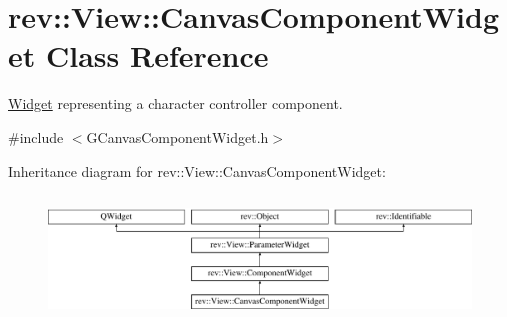 \hypertarget{classrev_1_1_view_1_1_canvas_component_widget}{}\section{rev\+::View\+::Canvas\+Component\+Widget Class Reference}
\label{classrev_1_1_view_1_1_canvas_component_widget}


\mbox{\hyperlink{class_widget}{Widget}} representing a character controller component.  




{\ttfamily \#include $<$G\+Canvas\+Component\+Widget.\+h$>$}

Inheritance diagram for rev\+::View\+::Canvas\+Component\+Widget\+:\begin{figure}[H]
\begin{center}
\leavevmode
\includegraphics[height=3.348281cm]{classrev_1_1_view_1_1_canvas_component_widget}
\end{center}
\end{figure}
